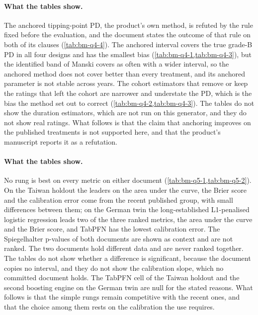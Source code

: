 

\paragraph{What the tables show.} The anchored tipping-point PD, the product's own method, is refuted by the rule fixed before the evaluation, and the document states the outcome of that rule on both of its clauses (\cref{tab:bm-q4-4}). The anchored interval covers the true grade-B PD in all four designs and has the smallest bias (\cref{tab:bm-q4-1,tab:bm-q4-3}), but the identified band of Manski covers as often with a wider interval, so the anchored method does not cover better than every treatment, and its anchored parameter is not stable across years. The cohort estimators that remove or keep the ratings that left the cohort are narrower and understate the PD, which is the bias the method set out to correct (\cref{tab:bm-q4-2,tab:bm-q4-3}). The tables do not show the duration estimators, which are not run on this generator, and they do not show real ratings. What follows is that the claim that anchoring improves on the published treatments is not supported here, and that the product's manuscript reports it as a refutation.



\paragraph{What the tables show.} No rung is best on every metric on either document (\cref{tab:bm-q5-1,tab:bm-q5-2}). On the Taiwan holdout the leaders on the area under the curve, the Brier score and the calibration error come from the recent published group, with small differences between them; on the German twin the long-established L1-penalised logistic regression leads two of the three ranked metrics, the area under the curve and the Brier score, and TabPFN has the lowest calibration error. The Spiegelhalter p-values of both documents are shown as context and are not ranked. The two documents hold different data and are never ranked together. The tables do not show whether a difference is significant, because the document copies no interval, and they do not show the calibration slope, which no committed document holds. The TabPFN cell of the Taiwan holdout and the second boosting engine on the German twin are null for the stated reasons. What follows is that the simple rungs remain competitive with the recent ones, and that the choice among them rests on the calibration the use requires.

